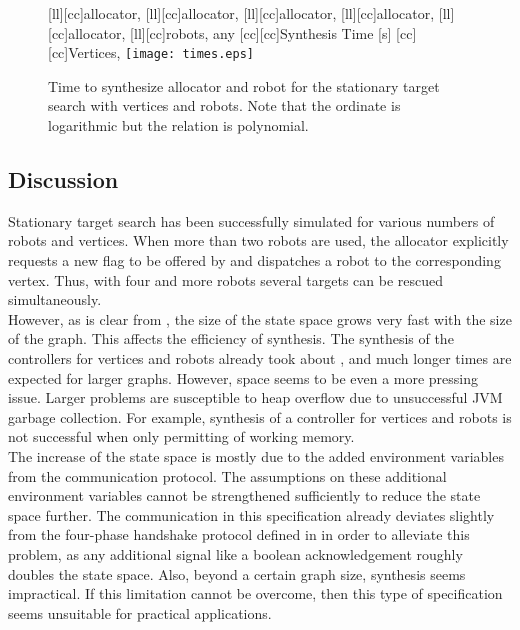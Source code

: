 \begin{figure}
\centering
	[ll][cc]{\footnotesize{allocator, }}
	[ll][cc]{\footnotesize{allocator, }}
	[ll][cc]{\footnotesize{allocator, }}
	[ll][cc]{\footnotesize{allocator, }}
	[ll][cc]{\footnotesize{allocator, }}
	[ll][cc]{\footnotesize{robots, any }}
	[cc][cc]{\footnotesize{Synthesis Time [s]}}
	[cc][cc]{\footnotesize{Vertices, }}
	\texttt{[image: times.eps]}
\caption{Time to synthesize allocator and robot for the stationary target search with  vertices and  robots. Note that the ordinate is logarithmic but the relation is polynomial.}
\label{fig:stattime}
\end{figure}





\subsection{Discussion}

Stationary target search has been successfully simulated for various numbers of robots and vertices. When more than two robots are used, the allocator explicitly requests a new flag to be offered by  and dispatches a robot to the corresponding vertex. Thus, with four and more robots several targets can be rescued simultaneously.\\

However, as is clear from , the size of the state space grows very fast with the size of the graph. This affects the efficiency of synthesis. The synthesis of the controllers for  vertices and  robots already took about , and much longer times are expected for larger graphs. However, space seems to be even a more pressing issue. Larger problems are susceptible to heap overflow due to unsuccessful JVM garbage collection. For example, synthesis of a controller for  vertices and  robots is not successful when only permitting  of working memory.\\

The increase of the state space is mostly due to the added environment variables from the communication protocol. The assumptions on these additional environment variables cannot be strengthened sufficiently to reduce the state space further. The communication in this specification already deviates slightly from the four-phase handshake protocol defined in  in order to alleviate this problem, as any additional signal like a boolean acknowledgement roughly doubles the state space. Also, beyond a certain graph size, synthesis seems impractical. If this limitation cannot be overcome, then this type of specification seems unsuitable for practical applications.\\


